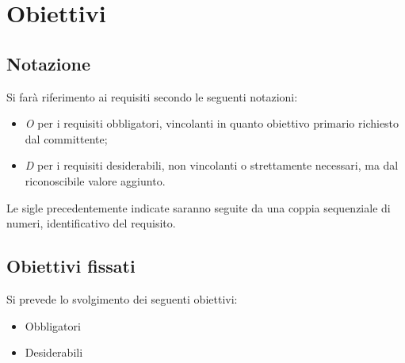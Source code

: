 \section*{Obiettivi}
\subsection*{Notazione}
Si farà riferimento ai requisiti secondo le seguenti notazioni:
\begin{itemize}
	\item \textit{O} per i requisiti obbligatori, vincolanti in quanto obiettivo primario richiesto dal committente;
	\item \textit{D} per i requisiti desiderabili, non vincolanti o strettamente necessari,
		  ma dal riconoscibile valore aggiunto.
\end{itemize}

Le sigle precedentemente indicate saranno seguite da una coppia sequenziale di numeri, identificativo del requisito.

\subsection*{Obiettivi fissati}
Si prevede lo svolgimento dei seguenti obiettivi:
\begin{itemize}
	\item Obbligatori
	\begin{itemize}
		\obiettiviObbligatori
	\end{itemize}
	
	\item Desiderabili 
	\begin{itemize}
		\obiettiviDesiderabili
	\end{itemize}
\end{itemize}

\newpage